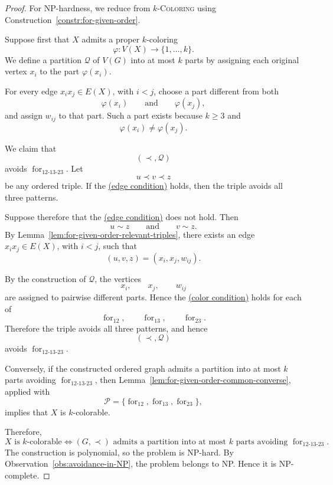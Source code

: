 \documentclass[12pt]{article}
\theoremstyle{plain}
\theoremstyle{definition}
\theoremstyle{remark}
\theoremstyle{definition}
\newcommand{\edgecondition}{%
  \hyperref[def:avoid:cond:edge]{(edge condition)}\xspace
}
\newcommand{\colorcondition}{%
  \hyperref[def:avoid:cond:color]{(color condition)}\xspace
}
\newcommand{\forlabel}{\mathrm{for}}
\DeclareRobustCommand{\forparam}[1]{%
  \ensuremath{\mathop{\forlabel}\nolimits_{#1}}%
}
\begin{document}
\begin{proof}
For NP-hardness, we reduce from \(k\)-\textsc{Coloring} using
Construction~\ref{constr:for-given-order}.

Suppose first that \(X\) admits a proper \(k\)-coloring
\[
\varphi:V(X)\to\{1,\dots,k\}.
\]
We define a partition \(\mathcal Q\) of \(V(G)\) into at most \(k\)
parts by assigning each original vertex \(x_i\) to the part
\(\varphi(x_i)\).

For every edge \(x_ix_j\in E(X)\), with \(i<j\), choose a part
different from both
\[
\varphi(x_i)
\qquad\text{and}\qquad
\varphi(x_j),
\]
and assign \(w_{ij}\) to that part. Such a part exists because
\(k\ge 3\) and
\[
\varphi(x_i)\neq\varphi(x_j).
\]

We claim that
\[
(\prec,\mathcal Q)
\]
avoids \(\forparam{12\text{-}13\text{-}23}\). Let
\[
u\prec v\prec z
\]
be any ordered triple. If the \edgecondition{} holds, then the triple
avoids all three patterns.

Suppose therefore that the \edgecondition{} does not hold. Then
\[
u\sim z
\qquad\text{and}\qquad
v\sim z.
\]
By Lemma~\ref{lem:for-given-order-relevant-triples}, there exists an
edge \(x_ix_j\in E(X)\), with \(i<j\), such that
\[
(u,v,z)=(x_i,x_j,w_{ij}).
\]

By the construction of \(\mathcal Q\), the vertices
\[
x_i,\qquad x_j,\qquad w_{ij}
\]
are assigned to pairwise different parts. Hence the
\colorcondition{} holds for each of
\[
\forparam{12},\qquad
\forparam{13},\qquad
\forparam{23}.
\]
Therefore the triple avoids all three patterns, and hence
\[
(\prec,\mathcal Q)
\]
avoids \(\forparam{12\text{-}13\text{-}23}\).

Conversely, if the constructed ordered graph admits a partition into
at most \(k\) parts avoiding
\(\forparam{12\text{-}13\text{-}23}\), then
Lemma~\ref{lem:for-given-order-common-converse}, applied with
\[
\mathcal P=
\{\forparam{12},\forparam{13},\forparam{23}\},
\]
implies that \(X\) is \(k\)-colorable.

Therefore,
\[
X\text{ is \(k\)-colorable}
\iff
(G,\prec)\text{ admits a partition into at most \(k\) parts avoiding }
\forparam{12\text{-}13\text{-}23}.
\]
The construction is polynomial, so the problem is NP-hard.
By Observation~\ref{obs:avoidance-in-NP}, the problem belongs to NP.
Hence it is NP-complete.
\end{proof}
\end{document}
